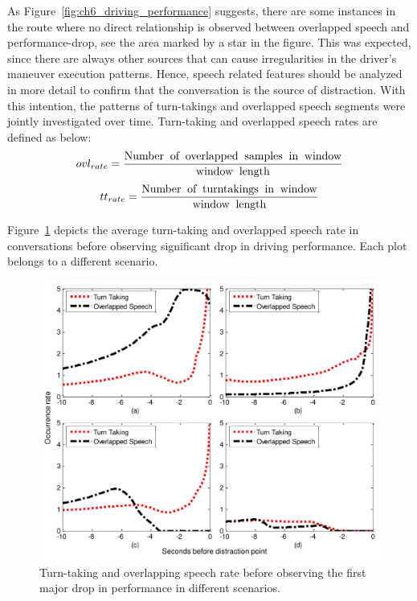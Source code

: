 As Figure~\ref{fig:ch6_driving_performance} suggests, there are some instances in the route where no direct relationship is observed between overlapped speech and performance-drop, see the area marked by a star in the figure. 
This was expected, since there are always other sources that can cause irregularities in the driver's maneuver execution patterns. 
Hence, speech related features should be analyzed in more detail to confirm that the conversation is the source of distraction. 
With this intention, the patterns of turn-takings and overlapped speech segments were jointly investigated over time. 
Turn-taking and overlapped speech rates are defined as below:
\begin{equation}
ovl_{rate} = \dfrac{\textrm{Number\: of\: overlapped\: samples\: in\: window}}{\textrm{window\: length}} \nonumber
\end{equation}
\begin{equation}
tt_{rate} = \dfrac{\textrm{Number\: of\: turntakings\: in\: window}}{\textrm{window\: length}} \nonumber
\end{equation}

Figure~\ref{fig:ch6_turntaking_and_overlap} depicts the average turn-taking and overlapped speech rate in conversations before observing significant drop in driving performance. 
Each plot belongs to a different scenario. 

\begin{figure}[h!]
	\vspace{1mm}
	\centering
	\includegraphics[scale=0.5]{figures/ttr_and_ovl}
	\caption {Turn-taking and overlapping speech rate before observing the first major drop in performance in different scenarios.}
	\label{fig:ch6_turntaking_and_overlap} 
\end{figure}

